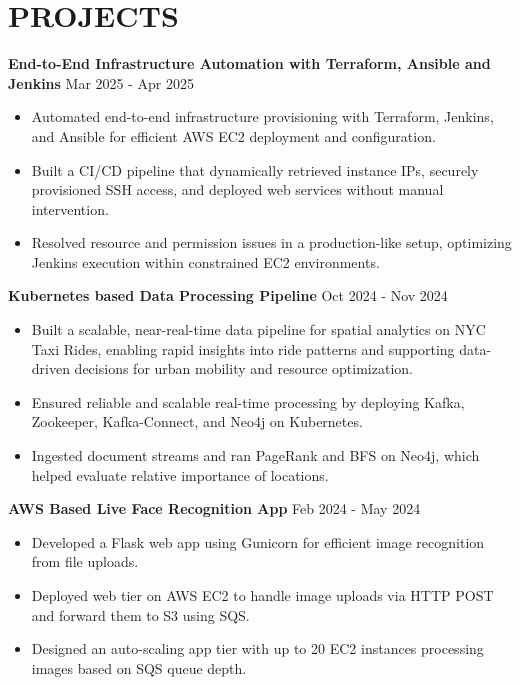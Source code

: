 \documentclass[a4paper,9pt]{extarticle}
\begin{document}
\section*{PROJECTS}

\textbf{End-to-End Infrastructure Automation with Terraform, Ansible and Jenkins} \hfill Mar 2025 - Apr 2025%
\begin{itemize}
    \item Automated end-to-end infrastructure provisioning with Terraform, Jenkins, and Ansible for efficient AWS EC2 deployment and configuration.
    \item Built a CI/CD pipeline that dynamically retrieved instance IPs, securely provisioned SSH access, and deployed web services without manual intervention.
    \item Resolved resource and permission issues in a production-like setup, optimizing Jenkins execution within constrained EC2 environments.
\end{itemize}

\noindent
\textbf{Kubernetes based Data Processing Pipeline}  \hfill Oct 2024 - Nov 2024%
\begin{itemize}
    \item Built a scalable, near-real-time data pipeline for spatial analytics on NYC Taxi Rides, enabling rapid insights into ride patterns and supporting data-driven decisions for urban mobility and resource optimization.
    \item Ensured reliable and scalable real-time processing by deploying Kafka, Zookeeper, Kafka-Connect, and Neo4j on Kubernetes.
    \item Ingested document streams and ran PageRank and BFS on Neo4j, which helped evaluate relative importance of locations.
    
\end{itemize}

\noindent
\textbf{AWS Based Live Face Recognition App}  \hfill Feb 2024 - May 2024 %
\begin{itemize}
    \item Developed a Flask web app using Gunicorn for efficient image recognition from file uploads.
    \item Deployed web tier on AWS EC2 to handle image uploads via HTTP POST and forward them to S3 using SQS.
    \item Designed an auto-scaling app tier with up to 20 EC2 instances processing images based on SQS queue depth.

    
\end{itemize}
\end{document}
